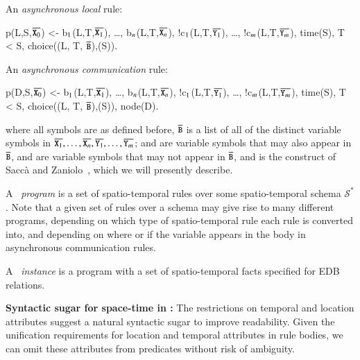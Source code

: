 An {\em asynchronous local} rule:

\begin{Dedalus}
p(L,S,\(\overline{\dedalus{X}\sb{0}}\)) <- b\(\sb{1}\)(L,T,\(\overline{\dedalus{X}\sb{1}}\)), \ldots, b\(\sb{n}\)(L,T,\(\overline{\dedalus{X}\sb{n}}\)),
!c\(\sb{1}\)(L,T,\(\overline{\dedalus{Y}\sb{1}}\)), \ldots, !c\(\sb{m}\)(L,T,\(\overline{\dedalus{Y}\sb{m}}\)), time(S),
T < S, choice((L, T, \(\overline{\dedalus{B}}\)),(S)).
\end{Dedalus}

An {\em asynchronous communication} rule:

\begin{Dedalus}
p(D,S,\(\overline{\dedalus{X}\sb{0}}\)) <- b\(\sb{1}\)(L,T,\(\overline{\dedalus{X}\sb{1}}\)), \ldots, b\(\sb{n}\)(L,T,\(\overline{\dedalus{X}\sb{n}}\)),
!c\(\sb{1}\)(L,T,\(\overline{\dedalus{Y}\sb{1}}\)), \ldots, !c\(\sb{m}\)(L,T,\(\overline{\dedalus{Y}\sb{m}}\)), time(S),
T < S, choice((L, T, \(\overline{\dedalus{B}}\)),(S)), node(D).
\end{Dedalus}

where all symbols are as defined before, $\overline{\dedalus{B}}$ is a list of all of the distinct variable symbols in $\overline{\dedalus{X}_1}, \ldots, \overline{\dedalus{X}_n}, \overline{\dedalus{Y}_1}, \ldots, \overline{\dedalus{Y}_m}$;  and  are variable symbols that may also appear in $\overline{\dedalus{B}}$,  and  are variable symbols that may not appear in $\overline{\dedalus{B}}$, and  is the construct of Sacc\`{a} and Zaniolo~\cite{sacca-zaniolo}, which we will presently describe.

A \lang\ {\em program} is a set of spatio-temporal rules over some spatio-temporal schema $\mathcal{S}^*$.  Note that a given set of rules over a schema may give rise to many different \lang programs, depending on which type of spatio-temporal rule each rule is converted into, and depending on where or if the variable  appears in the body in asynchronous communication rules.

A \lang\ {\em instance} is a program with a set of spatio-temporal facts specified for EDB relations.

\noindent
\textbf{Syntactic sugar for space-time in \lang:}
The restrictions on temporal and location attributes suggest a natural syntactic sugar to improve readability.  Given the unification requirements for location and temporal attributes in rule bodies, we can omit these attributes from predicates without risk of ambiguity.  

